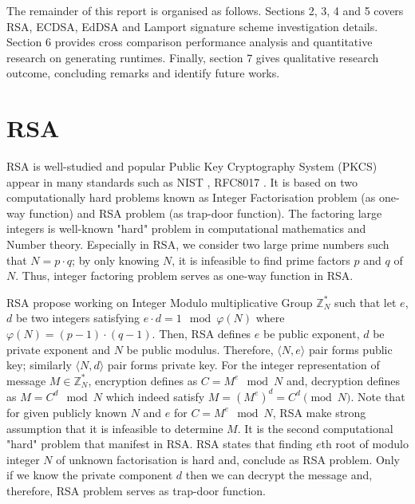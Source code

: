 \documentclass[10pt,sigconf]{acmart}
\newcommand{\Z}{\mathbb{Z}}
\begin{document}
The remainder of this report is organised as follows. Sections 2, 3, 4 and 5 covers RSA, ECDSA, EdDSA and Lamport signature scheme investigation details. Section 6 provides cross comparison performance analysis and quantitative research on generating runtimes. Finally, section 7 gives qualitative research outcome, concluding remarks and identify future works.


\section{RSA}


RSA \cite{Rivest:1978:MOD:359340.359342} is well-studied and popular Public Key Cryptography System (PKCS) appear in many standards such as NIST \cite{Kerry13fipspub}, RFC8017 \cite{rfc8017}. It is based on two computationally hard problems known as Integer Factorisation problem (as one-way function) and RSA problem (as trap-door function). The factoring large integers is well-known "hard" problem in computational mathematics and Number theory. Especially in RSA, we consider two large prime numbers such that $N = p \cdot q$; by only knowing $N$, it is infeasible to find prime factors $p$ and $q$ of $N$. Thus, integer factoring problem serves as one-way function in RSA.

RSA propose working on Integer Modulo multiplicative Group $\Z^{*}_{N}$ such that let $e$, $d$ be two integers satisfying $e \cdot d = 1 \mod \varphi(N)$ where $\varphi(N) = (p - 1) \cdot (q - 1)$. Then, RSA defines $e$ be public exponent, $d$ be private exponent and $N$ be public modulus. Therefore, $\langle N, e \rangle$ pair forms public key; similarly $\langle N, d \rangle$ pair forms private key. For the integer representation of message $M \in \Z^{*}_{N}$, encryption defines as $C = M^e \mod N$ and, decryption defines as $M = C^d \mod N$ which indeed satisfy $M = (M^e)^{d} = C^d \pmod N$. Note that for given publicly known $N$ and $e$ for $C = M^e \mod N$, RSA make strong assumption that it is infeasible to determine $M$. It is the second computational "hard" problem that manifest in RSA. RSA states that finding $e$th root of modulo integer $N$ of unknown factorisation is hard and, conclude as RSA problem. Only if we know the private component $d$ then we can decrypt the message and, therefore, RSA problem serves as trap-door function.
\end{document}

